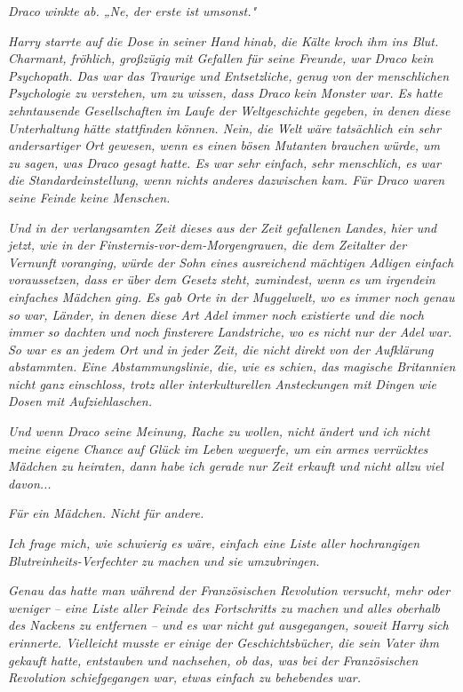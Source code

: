 {\emph{Draco winkte ab. „Ne, der erste ist umsonst."}

\emph{Harry starrte auf die Dose in seiner Hand hinab, die Kälte kroch ihm ins Blut. Charmant, fröhlich, großzügig mit Gefallen für seine Freunde, war Draco kein Psychopath. Das war das Traurige und Entsetzliche, genug von der menschlichen Psychologie zu verstehen, um zu wissen, dass Draco} \emph{\emph{kein}} \emph{Monster war. Es hatte zehntausende Gesellschaften im Laufe der Weltgeschichte gegeben, in denen diese Unterhaltung hätte stattfinden können. Nein, die Welt wäre tatsächlich ein sehr andersartiger Ort gewesen, wenn es einen} \emph{\emph{bösen Mutanten}} \emph{brauchen würde, um zu sagen, was Draco gesagt hatte. Es war sehr einfach, sehr menschlich, es war die Standardeinstellung, wenn nichts anderes dazwischen kam. Für Draco waren seine Feinde keine Menschen.}

\emph{Und in der verlangsamten Zeit dieses aus der Zeit gefallenen Landes, hier und jetzt, wie in der Finsternis-vor-dem-Morgengrauen, die dem Zeitalter der Vernunft voranging, würde der Sohn eines ausreichend mächtigen Adligen einfach voraussetzen, dass er über dem Gesetz steht, zumindest, wenn es um irgendein einfaches Mädchen ging. Es gab Orte in der Muggelwelt, wo es immer noch genau so war, Länder, in denen diese Art Adel immer noch existierte und die noch immer so dachten und noch finsterere Landstriche, wo es nicht nur der Adel war. So war es an jedem Ort und in jeder Zeit, die nicht direkt von der Aufklärung abstammten. Eine Abstammungslinie, die, wie es schien, das magische Britannien nicht ganz einschloss, trotz aller interkulturellen Ansteckungen mit Dingen wie Dosen mit Aufziehlaschen.}

\emph{\emph{Und wenn Draco seine Meinung, Rache zu wollen, nicht ändert und ich nicht meine eigene Chance auf Glück im Leben wegwerfe, um ein armes verrücktes Mädchen zu heiraten, dann habe ich gerade nur Zeit erkauft und nicht allzu viel davon...}}

\emph{Für ein Mädchen. Nicht für andere.}

\emph{\emph{Ich frage mich, wie schwierig es wäre, einfach eine Liste aller hochrangigen Blutreinheits-Verfechter zu machen und sie umzubringen.}}

\emph{Genau das hatte man während der Französischen Revolution versucht, mehr oder weniger -- eine Liste aller Feinde des Fortschritts zu machen und alles oberhalb des Nackens zu entfernen -- und es war nicht gut ausgegangen, soweit Harry sich erinnerte. Vielleicht musste er einige der Geschichtsbücher, die sein Vater ihm gekauft hatte, entstauben und nachsehen, ob das, was bei der Französischen Revolution schiefgegangen war, etwas einfach zu behebendes war.}

}
